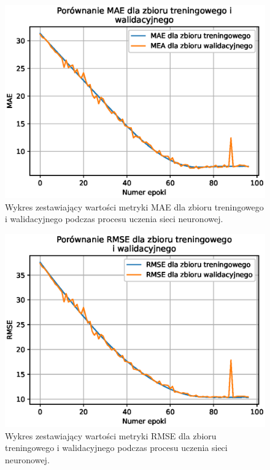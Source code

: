 \documentclass[a4paper,11pt]{article}
\begin{document}
    \bigskip

    \begin{figure}[H]
        \label{fig:f_m_mae_train_valid}
        \centering
        \includegraphics[width=\textwidth]{f_m_mae_train_valid}
        \caption{Wykres zestawiający wartości metryki MAE dla zbioru treningowego i walidacyjnego podczas procesu uczenia sieci neuronowej.}
    \end{figure}

    \bigskip

    \begin{figure}[H]
        \label{fig:f_m_rmse_train_valid}
        \centering
        \includegraphics[width=\textwidth]{f_m_rmse_train_valid}
        \caption{Wykres zestawiający wartości metryki RMSE dla zbioru treningowego i walidacyjnego podczas procesu uczenia sieci neuronowej.}
    \end{figure}
\end{document}
